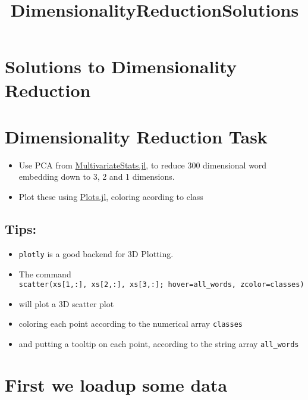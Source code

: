 \documentclass[11pt]{article}
\title{DimensionalityReductionSolutions}
\providecommand{\tightlist}{%
      \setlength{\itemsep}{0pt}\setlength{\parskip}{0pt}}
\begin{document}
    
    
    \maketitle
    
    

    
    \section{Solutions to Dimensionality
Reduction}\label{solutions-to-dimensionality-reduction}

\section{Dimensionality Reduction
Task}\label{dimensionality-reduction-task}

\begin{itemize}
\tightlist
\item
  Use PCA from
  \href{https://github.com/JuliaStats/MultivariateStats.jl}{MultivariateStats.jl},
  to reduce 300 dimensional word embedding down to 3, 2 and 1
  dimensions.
\item
  Plot these using
  \href{https://github.com/tbreloff/Plots.jl}{Plots.jl}, coloring
  acording to class
\end{itemize}

\subsection{Tips:}\label{tips}

\begin{itemize}
\tightlist
\item
  \texttt{plotly} is a good backend for 3D Plotting.
\item
  The command
  \texttt{scatter(xs{[}1,:{]},\ xs{[}2,:{]},\ xs{[}3,:{]};\ hover=all\_words,\ zcolor=classes)}
\item
  will plot a 3D scatter plot
\item
  coloring each point according to the numerical array \texttt{classes}
\item
  and putting a tooltip on each point, according to the string array
  \texttt{all\_words}
\end{itemize}

    \section{First we loadup some data}\label{first-we-loadup-some-data}
\end{document}
